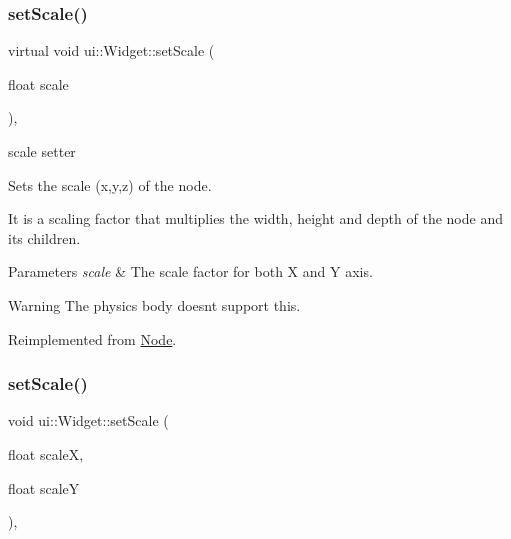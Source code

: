 \subsubsection{\texorpdfstring{set\+Scale()}{setScale()}\hspace{0.1cm}{\footnotesize\ttfamily [2/4]}}
{\footnotesize\ttfamily virtual void ui\+::\+Widget\+::set\+Scale (\begin{DoxyParamCaption}\item[{float}]{scale }\end{DoxyParamCaption})\hspace{0.3cm}{\ttfamily [override]}, {\ttfamily [virtual]}}



scale setter 

Sets the scale (x,y,z) of the node.

It is a scaling factor that multiplies the width, height and depth of the node and its children.


\begin{DoxyParams}{Parameters}
{\em scale} & The scale factor for both X and Y axis.\\
\hline
\end{DoxyParams}
\begin{DoxyWarning}{Warning}
The physics body doesn\textquotesingle{}t support this. 
\end{DoxyWarning}


Reimplemented from \hyperlink{classNode_acf0955a52f51a9d6c8b0c9267b1e8668}{Node}.

\mbox{\label{classui_1_1Widget_ace618234c5e35f66a9c569027cc9c5cf}} 
\subsubsection{\texorpdfstring{set\+Scale()}{setScale()}\hspace{0.1cm}{\footnotesize\ttfamily [3/4]}}
{\footnotesize\ttfamily void ui\+::\+Widget\+::set\+Scale (\begin{DoxyParamCaption}\item[{float}]{scaleX,  }\item[{float}]{scaleY }\end{DoxyParamCaption})\hspace{0.3cm}{\ttfamily [override]}, {\ttfamily [virtual]}}



